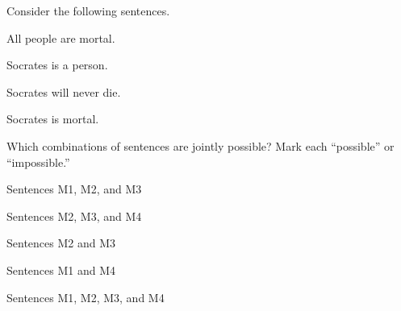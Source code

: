 \problempart Consider the following sentences.
\begin{compactlist}%
\item[M1.] \label{itm:allmortal} All people are mortal.
\item[M2.] \label{itm:socperson} Socrates is a person.
\item[M3.] \label{itm:socnotdie} Socrates will never die.
\item[M4.] \label{itm:socmortal} Socrates is mortal.
\end{compactlist}
Which combinations of sentences are jointly possible? Mark each ``possible'' or ``impossible.''
\begin{compactlist}
\item Sentences M1, M2, and M3
\item Sentences M2, M3, and M4
\item Sentences M2 and M3
\item Sentences M1 and M4
\item Sentences M1, M2, M3, and M4
\end{compactlist}

